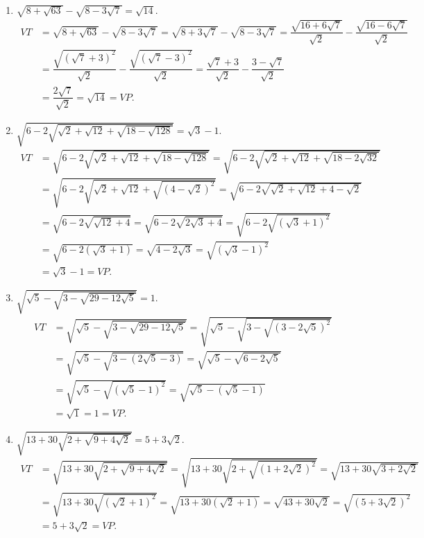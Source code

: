 \begin{bt}
{\begin{enumerate}
			\item $ \sqrt{8 + \sqrt{63}} - \sqrt{8 - 3\sqrt{7}} = \sqrt{14} $.
			\begin{align*}
			VT & = \sqrt{8 + \sqrt{63}} - \sqrt{8 - 3\sqrt{7}}= \sqrt{8 + 3\sqrt{7}} - \sqrt{8 - 3\sqrt{7}} = \dfrac{\sqrt{16 + 6\sqrt{7}}}{\sqrt{2}} - \dfrac{\sqrt{16 - 6\sqrt{7}}}{\sqrt{2}}\\
			& = \dfrac{\sqrt{\left(\sqrt{7} + 3\right)^2}}{\sqrt{2}} - \dfrac{\sqrt{\left(\sqrt{7} - 3\right)^2}}{\sqrt{2}}
			= \dfrac{\sqrt{7} + 3}{\sqrt{2}} - \dfrac{3 - \sqrt{7}}{\sqrt{2}}\\
			& = \dfrac{2\sqrt{7}}{\sqrt{2}} = \sqrt{14} = VP.
			\end{align*}
			
			\item $ \sqrt{6 - 2\sqrt{\sqrt{2} + \sqrt{12} + \sqrt{18 - \sqrt{128}}}} = \sqrt{3} - 1 $.
			\begin{align*}
			VT & = \sqrt{6 - 2\sqrt{\sqrt{2} + \sqrt{12} + \sqrt{18 - \sqrt{128}}}}
			= \sqrt{6 - 2\sqrt{\sqrt{2} + \sqrt{12} + \sqrt{18 - 2\sqrt{32}}}}\\
			& = \sqrt{6 - 2\sqrt{\sqrt{2} + \sqrt{12} + \sqrt{\left(4 - \sqrt{2}\right)^2}}}
			= \sqrt{6 - 2\sqrt{\sqrt{2} + \sqrt{12} + 4 - \sqrt{2}}}\\
			& = \sqrt{6 - 2\sqrt{\sqrt{12} + 4}} = \sqrt{6 - 2\sqrt{2\sqrt{3} + 4}} = \sqrt{6 - 2\sqrt{\left(\sqrt{3} + 1\right)^2}}\\
			& = \sqrt{6 - 2\left(\sqrt{3} + 1\right)} = \sqrt{4 - 2\sqrt{3}} = \sqrt{\left(\sqrt{3} - 1\right)^2}\\
			& = \sqrt{3} - 1 = VP.
			\end{align*}
			
			\item $ \sqrt{\sqrt{5} - \sqrt{3-\sqrt{29 - 12\sqrt{5}}}} = 1 $.
			\begin{align*}
			VT & = \sqrt{\sqrt{5} - \sqrt{3-\sqrt{29 - 12\sqrt{5}}}} = \sqrt{\sqrt{5} - \sqrt{3-\sqrt{\left(3 - 2\sqrt{5}\right)^2}}}\\
			& = \sqrt{\sqrt{5} - \sqrt{3-\left(2\sqrt{5} - 3\right)}} = \sqrt{\sqrt{5} - \sqrt{6 - 2\sqrt{5}}}\\
			& = \sqrt{\sqrt{5} - \sqrt{\left(\sqrt{5} - 1\right)^2}} = \sqrt{\sqrt{5} - \left(\sqrt{5} - 1\right)}\\
			& = \sqrt{1} = 1 = VP.
			\end{align*}
			
			\item $ \sqrt{13 + 30\sqrt{2 + \sqrt{9 + 4\sqrt{2}}}} = 5 + 3\sqrt{2} $.
			\begin{align*}
			VT & = \sqrt{13 + 30\sqrt{2 + \sqrt{9 + 4\sqrt{2}}}}
			= \sqrt{13 + 30\sqrt{2 + \sqrt{\left(1 + 2\sqrt{2}\right)^2}}} 
			= \sqrt{13 + 30\sqrt{3 + 2\sqrt{2}}} \\
			& = \sqrt{13 + 30\sqrt{\left(\sqrt{2} + 1\right)^2}}
			= \sqrt{13 + 30\left(\sqrt{2} + 1\right)} 
			= \sqrt{43 + 30\sqrt{2}} 
			= \sqrt{\left( 5 + 3\sqrt{2} \right)^2} \\
			& = 5 + 3\sqrt{2} = VP.
			\end{align*}
		\end{enumerate}
	}
\end{bt}

